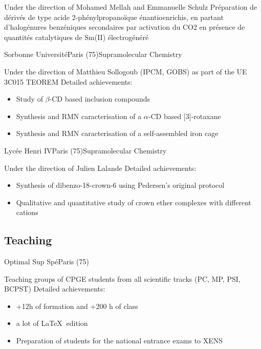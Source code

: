 \documentclass[11pt,a4paper,sans]{moderncv}
\begin{document}
%
{Under the direction of Mohamed Mellah and Emmanuelle Schulz\newline{}%
Préparation de dérivés de type acide 2-phénylpropanoïque énantioenrichis, en partant d'halogénures benzéniques secondaires par activation du CO2 en présence de quantités catalytiques de Sm(II) électrogénéré
}


%
{Sorbonne Université}{Paris (75)}{Supramolecular Chemistry}%
{Under the direction of Matthieu Sollogoub (IPCM, GOBS) as part of the UE 3C015 TEOREM\newline{}%
Detailed achievements:%
\begin{itemize}%
\item Study of $\beta$-CD based inclusion compounds
\item Synthesis and RMN caracterisation of a $\alpha$-CD based [3]-rotaxane
\item Synthesis and RMN caracterisation of a self-assembled iron cage
\end{itemize}
}

%
{Lycée Henri IV}{Paris (75)}{Supramolecular Chemistry}%
{Under the direction of Julien Lalande \newline{}%
Detailed achievements:%
\begin{itemize}%
\item Synthesis of dibenzo-18-crown-6 using Pedersen's original protocol
\item Qualitative and quantitative study of crown ether complexes with different cations
\end{itemize}
}


\subsection{Teaching}
%
{Optimal Sup Spé}{Paris (75)}{}%
{Teaching groups of CPGE students from all scientific tracks (PC, MP, PSI, BCPST)\newline{}%
Detailed achievements:%
\begin{itemize}%
\item +12h of formation and +200 h of class
\item a lot of {\LaTeX} $~$edition
\item Preparation of students for the national entrance exams to XENS
\end{itemize}
}
\end{document}
